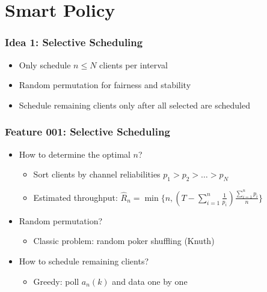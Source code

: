 \documentclass{beamer}
\begin{document}
\section{Smart Policy}

\begin{frame}
\frametitle{Idea 1: Selective Scheduling}
\begin{itemize}
\item Only schedule $n \le N$ clients per interval
\item Random permutation for fairness and stability
\item Schedule remaining clients only after all selected are scheduled
\end{itemize}
\end{frame}


\begin{frame}
\frametitle{Feature 001: Selective Scheduling}
\begin{itemize}
\item How to determine the optimal $n$?
  \begin{itemize}
    \item Sort clients by channel reliabilities $p_1 > p_2 > \dots > p_N$
    \item Estimated throughput: $\hat{R}_n = \min\{n, (T-\sum_{i=1}^{n}\frac{1}{p_i})\frac{\sum_{i=1}^{n}p_i}{n} \}$
  \end{itemize}
\item Random permutation?
  \begin{itemize}
    \item Classic problem: random poker shuffling (Knuth)
  \end{itemize}
\item How to schedule remaining clients?
  \begin{itemize}
    \item Greedy: poll $a_n(k)$ and data one by one
  \end{itemize}
\end{itemize}
\end{frame}
\end{document}
